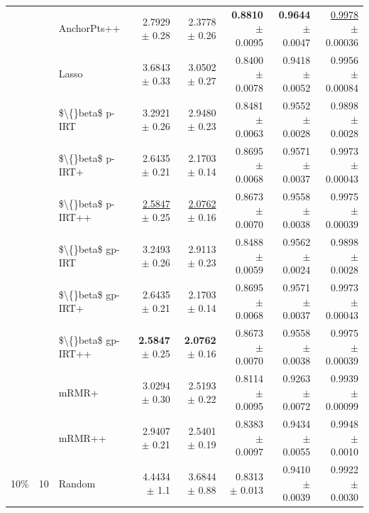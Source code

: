 \begin{longtable}{llp{}rrrrr}
 &  & AnchorPts++ & 2.7929 {\scriptsize $\pm$ 0.28} & 2.3778 {\scriptsize $\pm$ 0.26} & \textbf{0.8810} {\scriptsize $\pm$ 0.0095} & \textbf{0.9644} {\scriptsize $\pm$ 0.0047} & \underline{0.9978} {\scriptsize $\pm$ 0.00036} \\
 &  & Lasso & 3.6843 {\scriptsize $\pm$ 0.33} & 3.0502 {\scriptsize $\pm$ 0.27} & 0.8400 {\scriptsize $\pm$ 0.0078} & 0.9418 {\scriptsize $\pm$ 0.0052} & 0.9956 {\scriptsize $\pm$ 0.00084} \\
 &  & \$\textbackslash\{\}beta\$ p-IRT & 3.2921 {\scriptsize $\pm$ 0.26} & 2.9480 {\scriptsize $\pm$ 0.23} & 0.8481 {\scriptsize $\pm$ 0.0063} & 0.9552 {\scriptsize $\pm$ 0.0028} & 0.9898 {\scriptsize $\pm$ 0.0028} \\
 &  & \$\textbackslash\{\}beta\$ p-IRT+ & 2.6435 {\scriptsize $\pm$ 0.21} & 2.1703 {\scriptsize $\pm$ 0.14} & 0.8695 {\scriptsize $\pm$ 0.0068} & 0.9571 {\scriptsize $\pm$ 0.0037} & 0.9973 {\scriptsize $\pm$ 0.00043} \\
 &  & \$\textbackslash\{\}beta\$ p-IRT++ & \underline{2.5847} {\scriptsize $\pm$ 0.25} & \underline{2.0762} {\scriptsize $\pm$ 0.16} & 0.8673 {\scriptsize $\pm$ 0.0070} & 0.9558 {\scriptsize $\pm$ 0.0038} & 0.9975 {\scriptsize $\pm$ 0.00039} \\
 &  & \$\textbackslash\{\}beta\$ gp-IRT & 3.2493 {\scriptsize $\pm$ 0.26} & 2.9113 {\scriptsize $\pm$ 0.23} & 0.8488 {\scriptsize $\pm$ 0.0059} & 0.9562 {\scriptsize $\pm$ 0.0024} & 0.9898 {\scriptsize $\pm$ 0.0028} \\
 &  & \$\textbackslash\{\}beta\$ gp-IRT+ & 2.6435 {\scriptsize $\pm$ 0.21} & 2.1703 {\scriptsize $\pm$ 0.14} & 0.8695 {\scriptsize $\pm$ 0.0068} & 0.9571 {\scriptsize $\pm$ 0.0037} & 0.9973 {\scriptsize $\pm$ 0.00043} \\
 &  & \$\textbackslash\{\}beta\$ gp-IRT++ & \textbf{2.5847} {\scriptsize $\pm$ 0.25} & \textbf{2.0762} {\scriptsize $\pm$ 0.16} & 0.8673 {\scriptsize $\pm$ 0.0070} & 0.9558 {\scriptsize $\pm$ 0.0038} & 0.9975 {\scriptsize $\pm$ 0.00039} \\
 &  & mRMR+ & 3.0294 {\scriptsize $\pm$ 0.30} & 2.5193 {\scriptsize $\pm$ 0.22} & 0.8114 {\scriptsize $\pm$ 0.0095} & 0.9263 {\scriptsize $\pm$ 0.0072} & 0.9939 {\scriptsize $\pm$ 0.00099} \\
 &  & mRMR++ & 2.9407 {\scriptsize $\pm$ 0.21} & 2.5401 {\scriptsize $\pm$ 0.19} & 0.8383 {\scriptsize $\pm$ 0.0097} & 0.9434 {\scriptsize $\pm$ 0.0055} & 0.9948 {\scriptsize $\pm$ 0.0010} \\
\midrule
10\% & 10 & Random & 4.4434 {\scriptsize $\pm$ 1.1} & 3.6844 {\scriptsize $\pm$ 0.88} & 0.8313 {\scriptsize $\pm$ 0.013} & 0.9410 {\scriptsize $\pm$ 0.0039} & 0.9922 {\scriptsize $\pm$ 0.0030} \\

\end{longtable}
